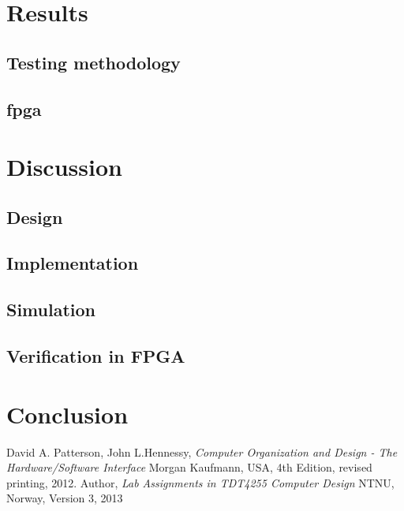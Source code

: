 \documentclass{report}
\begin{document}
\chapter{Results}


\section{Testing methodology}


\section{fpga}


\newpage
\chapter{Discussion}
\section{Design}


\section{Implementation}


\section{Simulation}


\section{Verification in FPGA}


\newpage
\chapter{Conclusion}

\newpage

\begin{thebibliography}{2}
	David A. Patterson, John L.Hennessy,
	\emph{Computer Organization and Design - The Hardware/Software Interface}
	Morgan Kaufmann, USA,
	4th Edition, revised printing,
	2012.
	Author,
	\emph{Lab Assignments in TDT4255 Computer Design}
	NTNU, Norway,
	Version 3,
	2013
\end{thebibliography}


\end{document}
